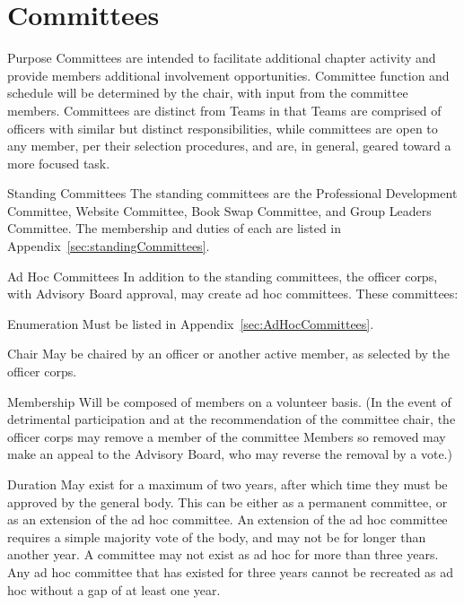 \section{Committees} %
\begin{enumsubsection}
\item{Purpose} Committees are intended to facilitate additional chapter activity and provide members additional involvement opportunities.  Committee function and schedule will be determined by the chair, with input from the committee members. Committees are distinct from Teams in that Teams are comprised of officers with similar but distinct responsibilities, while committees are open to any member, per their selection procedures, and are, in general,  geared toward a more focused task.
\item{Standing Committees} The standing committees are the Professional Development Committee, Website Committee, Book Swap Committee, and Group Leaders Committee. The membership and duties of each are listed in Appendix~\ref{sec:standingCommittees}.
\item{Ad Hoc Committees}\label{sec:AdHocCommitteeCreation} In addition to the standing committees, the officer corps, with Advisory Board approval, may create ad hoc committees. These committees:
\begin{enumsubsubsection}
\item*{Enumeration} Must be listed in Appendix~\ref{sec:AdHocCommittees}.
\item*{Chair} May be chaired by an officer or another active member, as selected by the officer corps. 
\item*{Membership} Will be composed of  members on a volunteer basis. (In the event of detrimental participation and at the recommendation of the committee chair, the officer corps may remove a member of the committee Members so removed may make an appeal to the Advisory Board, who may reverse the removal by a  vote.)
\item*{Duration} May exist for a maximum of two years, after which time they must be approved by the general body. This can be either as a permanent committee, or as an extension of the ad hoc committee. An extension of the ad hoc committee requires a simple majority vote of the body, and may not be for longer than another year. A committee may not exist as ad hoc for more than three years. Any ad hoc committee that has existed for three years cannot be recreated as ad hoc without a gap of at least one year.
\end{enumsubsubsection}
\end{enumsubsection}
